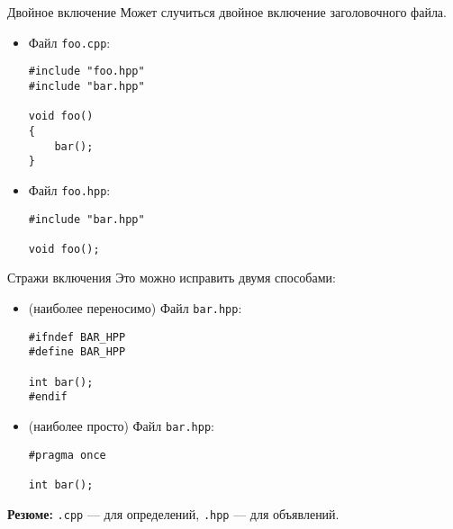 \documentclass{beamer}
\begin{document}
\begin{frame}[fragile]{Двойное включение}
Может случиться двойное включение заголовочного файла.
\begin{itemize}
    \item Файл {\tt foo.cpp}:
\begin{lstlisting}
#include "foo.hpp"
#include "bar.hpp"

void foo()
{
    bar();
}
\end{lstlisting}

    \item Файл {\tt foo.hpp}:
\begin{lstlisting}
#include "bar.hpp"

void foo();
\end{lstlisting}
\end{itemize}
\end{frame}

\begin{frame}[fragile]{Стражи включения}
Это можно исправить двумя способами:
\begin{itemize}
    \item (наиболее переносимо) Файл {\tt bar.hpp}:
\begin{lstlisting}
#ifndef BAR_HPP
#define BAR_HPP

int bar();
#endif
\end{lstlisting}
    \item (наиболее просто) Файл {\tt bar.hpp}: 
\begin{lstlisting}
#pragma once

int bar();
\end{lstlisting}
\end{itemize}
{\bf Резюме:} {\tt .cpp} — для определений, {\tt .hpp} — для объявлений.
\end{frame}
\end{document}
